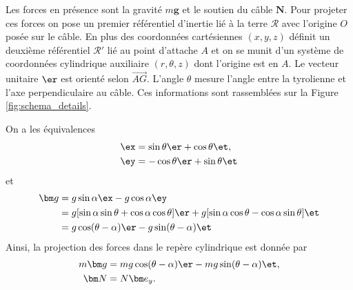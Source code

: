 \par\vspace{2mm}
Les forces en présence sont la gravité $m\bm g$ et le soutien du câble $\bm N$.
Pour projeter ces forces on pose un premier référentiel d'inertie lié à la terre $\mathcal R$ avec l'origine $O$ posée sur le câble. 
En plus des coordonnées cartésiennes $(x,y,z)$ définit un deuxième référentiel $\mathcal R'$ lié au point d'attache $A$ et on se munit d'un système de coordonnées cylindrique auxiliaire $(r,\theta,z)$ dont l'origine est en $A$.
Le vecteur unitaire $\er$ est orienté selon $\overrightarrow{AG}$.
L'angle $\theta$ mesure l'angle entre la tyrolienne et l'axe perpendiculaire au câble.
Ces informations sont rassemblées sur la Figure \ref{fig:schema_details}.
\par 
On a les équivalences
\begin{align}
    \ex &= \sin\theta \er + \cos\theta \et,    \label{eq:ex_rt}\\
    \ey &= -\cos\theta \er + \sin\theta \et
    \label{eq:ey_rt}
\end{align}
et
\begin{align}
    \bm g &= g\sin\alpha \ex - g\cos\alpha \ey\nonumber\\
        &= g[\sin\alpha\sin\theta + \cos\alpha\cos\theta]\er + g[\sin\alpha\cos\theta - \cos\alpha\sin\theta]\et\nonumber\\
        &= g\cos(\theta-\alpha)\er - g\sin(\theta-\alpha)\et
\end{align}
Ainsi, la projection des forces dans le repère cylindrique est donnée par
\begin{align}
    m\bm g &= mg\cos(\theta-\alpha) \er - mg\sin(\theta-\alpha) \et,\\
    \bm N  &= N \bm e_y.
\end{align}

